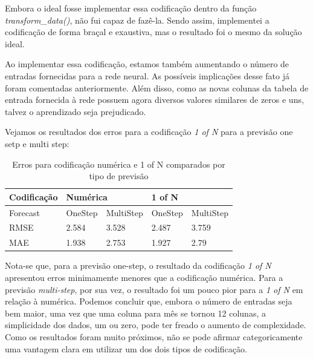 \documentclass[12pt]{article}
\begin{document}
	Embora o ideal fosse implementar essa codificação dentro da função \textit{transform\_data()}, não fui capaz de fazê-la. Sendo assim, implementei a codificação de forma braçal e exaustiva, mas o resultado foi o mesmo da solução ideal.
	
	Ao implementar essa codificação, estamos também aumentando o número de entradas fornecidas para a rede neural. As possíveis implicações desse fato já foram comentadas anteriormente. Além disso, como as novas colunas da tabela de entrada fornecida à rede possuem agora diversos valores similares de zeros e uns, talvez o aprendizado seja prejudicado.
	
	Vejamos os resultados dos erros para a codificação \textit{1 of N} para a previsão one setp e multi step:
	
	\begin{table}[H]
		\centering
		\begin{tabular}{|l|l|l|l|l|}
			\hline
			Codificação & \multicolumn{2}{l|}{Numérica} & \multicolumn{2}{l|}{1 of N} \\ \hline
			Forecast    & OneStep      & MultiStep      & OneStep     & MultiStep     \\ \hline
			RMSE        & 2.584        & 3.528          & 2.487       & 3.759         \\ \hline
			MAE         & 1.938        & 2.753          & 1.927       & 2.79          \\ \hline
		\end{tabular}
	\caption{Erros para codificação numérica e 1 of N comparados por tipo de previsão}
	\end{table}
	
	Nota-se que, para a previsão one-step, o resultado da codificação \textit{1 of N} apresentou erros minimamente menores que a codificação numérica. Para a previsão \textit{multi-step}, por sua vez, o resultado foi um pouco pior para a \textit{1 of N} em relação à numérica. Podemos concluir que, embora o número de entradas seja bem maior, uma vez que uma coluna para mês se tornou 12 colunas, a simplicidade dos dados, um ou zero, pode ter freado o aumento de complexidade. Como os resultados foram muito próximos, não se pode afirmar categoricamente uma vantagem clara em utilizar um dos dois tipos de codificação.
	
	 
	
\end{document}
